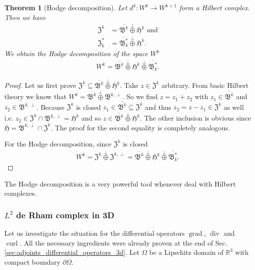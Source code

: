\documentclass[12pt,a4paper]{article}
\numberwithin{equation}{subsection}
\numberwithin{lemma}{subsection}
\newtheorem{theorem}[lemma]{Theorem}
\theoremstyle{definition}
\DeclareMathOperator{\curl}{curl}
\DeclareMathOperator{\diver}{div}
\DeclareMathOperator{\grad}{grad}
\newcommand{\real}{\mathbb{R}}
\begin{document}
\begin{theorem}[Hodge decomposition]\label{thm:hodge_decomposition}
    Let $d^k: W^k \rightarrow W^{k+1}$ form a Hilbert complex. 
    Then we have
    \begin{align*}
        \mathfrak{Z}^k &= \overline{\mathfrak{B}^k} \stackrel{\perp}{\oplus}
            \mathfrak{H}^k \text{ and}
        \\ \mathfrak{Z}^*_k &= 
            \overline{\mathfrak{B}^*_k} \stackrel{\perp}{\oplus}
            \mathfrak{H}^k.
    \end{align*}
    We obtain the Hodge decomposition of the space $W^k$
    \begin{align*}
        W^k = \overline{\mathfrak{B}^k} \stackrel{\perp}{\oplus}
            \mathfrak{H}^k \stackrel{\perp}{\oplus} \overline{\mathfrak{B}^*_k}.
    \end{align*}
\end{theorem}
\begin{proof}
    Let us first prove $\mathfrak{Z}^k \subseteq 
    \overline{\mathfrak{B}^k} \stackrel{\perp}{\oplus} \mathfrak{H}^k$.
    Take $z \in \mathfrak{Z}^k$ arbitrary. 
    From basic Hilbert theory we know that 
    $W^k = \overline{\mathfrak{B}^k} \stackrel{\perp}{\oplus} 
    \mathfrak{B}^{k,\perp}$. So we find $z = z_1 + z_2$ with
    $z_1 \in \overline{\mathfrak{B}^k}$ and $z_2 \in 
    \mathfrak{B}^{k,\perp}$. 
    Because $\mathfrak{Z}^k$ is closed 
    $z_1 \in \overline{\mathfrak{B}^k} \subseteq \mathfrak{Z}^k$ 
    and thus $z_2 = z - z_1 \in \mathfrak{Z}^k$ as well i.e. $z_2 \in \mathfrak{Z}^k 
    \cap \mathfrak{B}^{k,\perp} = \mathfrak{H}^k$ and so 
    $z \in \overline{\mathfrak{B}^k} \stackrel{\perp}{\oplus}
    \mathfrak{H}^k$. The other inclusion is obvious since 
    $\mathfrak{H} = \mathfrak{B}^{k,\perp} \cap \mathfrak{Z}^k$.
    The proof for the second equality is completely analogous. 

    For the Hodge decomposition, since $\mathfrak{Z}^k$ is closed 
    \begin{align*}
        W^k = \mathfrak{Z}^k \stackrel{\perp}{\oplus} \mathfrak{Z}^{k,\perp}
        =  \overline{\mathfrak{B}^k} \stackrel{\perp}{\oplus}
            \mathfrak{H}^k \stackrel{\perp}{\oplus} \overline{\mathfrak{B}^*_k}.
    \end{align*}
\end{proof}
The Hodge decomposition is a very powerful tool whenever deal with Hilbert
complexes.

\subsubsection{$L^2$ de Rham complex in 3D} \label{sec:l2_de_rham_complex_in_3d}
Let us investigate the situation for the differential operators 
$\grad$, $\diver$ and $\curl$. All the necessary ingredients were already 
proven at the end of Sec.\,\ref{sec:adjoints_differential_operators_3d}. 
Let $\Omega$ be a Lipschitz domain of 
$\real^3$ with compact boundary $\partial \Omega$. %
\end{document}
